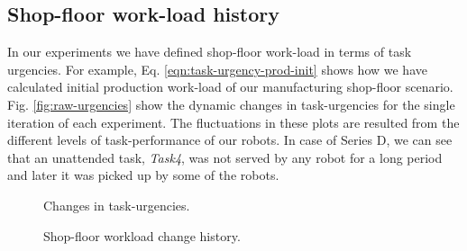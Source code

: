 \documentclass[journal]{IEEEtran}
\begin{document}
\subsection{Shop-floor work-load history}
In our experiments we have defined shop-floor work-load in terms of task urgencies. For example, Eq. \ref{eqn:task-urgency-prod-init} shows how we have calculated initial production work-load of our manufacturing shop-floor scenario. Fig. \ref{fig:raw-urgencies}  show the dynamic changes in task-urgencies for the single iteration of each experiment. The fluctuations in these plots are resulted from the different levels of task-performance of our robots. In case of Series D, we can see that an unattended task, \textit{Task4}, was not served by any robot for a long period and later it was picked up by some of the robots. 
\begin{figure*}
\begin{minipage}[t]{0.48\linewidth}
\centering
{}
\newline
{}
\newline
{}
\newline
{}
\newline
\caption{Changes in task-urgencies.}
\label{fig:raw-urgencies}
\end{minipage}
\begin{minipage}[t]{0.48\linewidth}
\centering
{}
\newline
{}
\newline
{}
\newline
{}
\newline
\caption{Shop-floor workload change history.}
\label{fig:urgency-stat}
\end{minipage}
\end{figure*}
\end{document}
